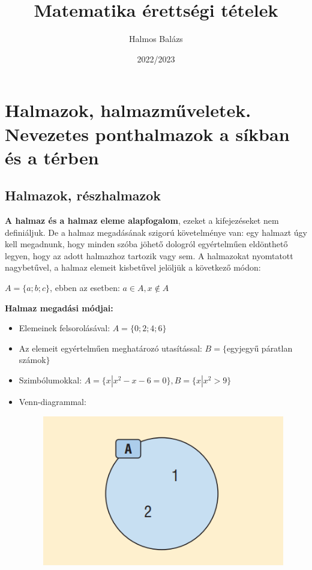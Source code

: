\documentclass[12pt,a4paper]{article}
\author{Halmos Balázs}
\date{2022/2023}
\title{Matematika érettségi tételek}
\begin{document}
\maketitle
\tableofcontents
\newpage
\section{Halmazok, halmazműveletek. Nevezetes ponthalmazok a síkban és a térben}

\subsection{Halmazok, részhalmazok}

\textbf{A halmaz és a halmaz eleme alapfogalom}, ezeket a kifejezéseket nem definiáljuk. De a halmaz megadásának szigorú követelménye van: egy halmazt úgy kell megadnunk, hogy minden szóba jöhető dologról egyértelműen eldönthető legyen, hogy az adott halmazhoz tartozik vagy sem. A halmazokat nyomtatott nagybetűvel, a halmaz elemeit kisbetűvel jelöljük a következő módon:

$A=\{a;b;c\}$, ebben az esetben: $a\in A, x\notin A$

\vspace{20px}
\textbf{Halmaz megadási módjai:}
\begin{itemize}
\item  Elemeinek felsorolásával: $A = \{0; 2; 4; 6\}$
\item  Az elemeit egyértelműen meghatározó utasítással: $B = \{$egyjegyű páratlan számok$\}$
\item Szimbólumokkal: $A=\{x|x^2-x-6=0\}, B=\{x|x^2>9\}$
\item Venn-diagrammal:
\begin{figure}[h]
\centering
\includegraphics[scale=0.3]{img/venn_diagram}
\end{figure}
\end{itemize}
\end{document}
